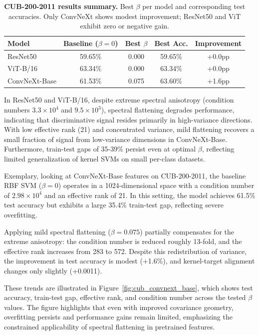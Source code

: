 \documentclass{article}
\begin{document}
\begin{table}[h]
\centering
\caption{\textbf{CUB-200-2011 results summary.} Best $\beta$ per model and corresponding test accuracies. Only ConvNeXt shows modest improvement; ResNet50 and ViT exhibit zero or negative gain.}
\label{tab:cub_results}
\begin{tabular}{lcccc}
\toprule
Model & Baseline ($\beta=0$) & Best $\beta$ & Best Acc. & Improvement \\
\midrule
ResNet50 & 59.65\% & 0.000 & 59.65\% & +0.0pp \\
ViT-B/16 & 63.34\% & 0.000 & 63.34\% & +0.0pp \\
ConvNeXt-Base & 61.53\% & 0.075 & 63.60\% & +1.6pp \\
\bottomrule
\end{tabular}
\end{table}

In ResNet50 and ViT-B/16, despite extreme spectral anisotropy (condition numbers $3.3\times 10^4$ and $9.5\times 10^3$), spectral flattening degrades performance, indicating that discriminative signal resides primarily in high-variance directions.
With low effective rank (21) and concentrated variance, mild flattening recovers a small fraction of signal from low-variance dimensions in ConvNeXt-Base.
Furthermore, train-test gaps of 35-39\% persist even at optimal $\beta$, reflecting limited generalization of kernel SVMs on small per-class datasets.

Exemplary, looking at ConvNeXt-Base features on CUB-200-2011, the baseline RBF SVM ($\beta=0$) operates in a 1024-dimensional space with a condition number of $2.98\times10^4$ and an effective rank of 21. In this setting, the model achieves 61.5\% test accuracy but exhibits a large 35.4\% train-test gap, reflecting severe overfitting. 

Applying mild spectral flattening ($\beta=0.075$) partially compensates for the extreme anisotropy: the condition number is reduced roughly 13-fold, and the effective rank increases from 283 to 572. Despite this redistribution of variance, the improvement in test accuracy is modest (+1.6\%), and kernel-target alignment changes only slightly (+0.0011). 

These trends are illustrated in Figure~\ref{fig:cub_convnext_base}, which shows test accuracy, train-test gap, effective rank, and condition number across the tested $\beta$ values. The figure highlights that even with improved covariance geometry, overfitting persists and performance gains remain limited, emphasizing the constrained applicability of spectral flattening in pretrained features.
\end{document}
